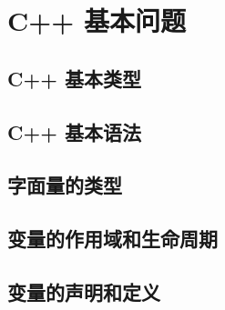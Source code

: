 \documentclass{article}
\begin{document}
	
	\tableofcontents
	
	
	\section{C++ 基本问题}

	\subsection{C++ 基本类型}
	
	
	\subsection{C++ 基本语法}
	
	
	
	
	
	\subsection{字面量的类型}
	
	
	
	
	\subsection{变量的作用域和生命周期}
	
	
	
	\subsection{变量的声明和定义}
	
\end{document}
